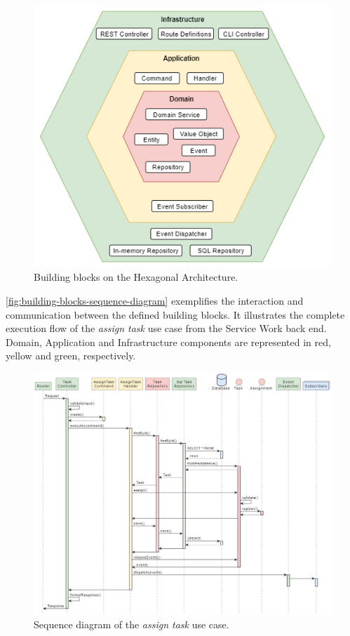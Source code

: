 \begin{figure}[htbp]
  \centering
  \includegraphics[scale=0.7]{Imagens/chap04/building-blocks-hexagon.png}
  \caption{Building blocks on the Hexagonal Architecture.}
  \label{fig:building-blocks-hexagon}
\end{figure}

\autoref{fig:building-blocks-sequence-diagram} exemplifies the interaction and communication between the defined building blocks. It illustrates the complete execution flow of the \textit{assign task} use case from the Service Work back end. Domain, Application and Infrastructure components are represented in red, yellow and green, respectively.

\begin{figure}[htbp]
  \centering
  \includegraphics[scale=0.37]{Imagens/chap04/building-blocks-sequence-diagram.png}
  \caption{Sequence diagram of the \textit{assign task} use case.}
  \label{fig:building-blocks-sequence-diagram}
\end{figure}


